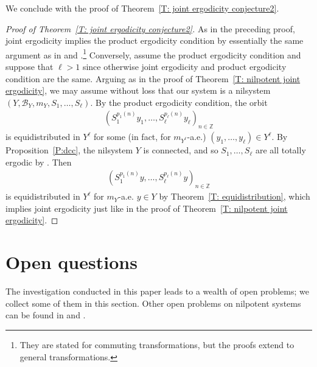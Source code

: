 \documentclass[11pt]{amsart}
\theoremstyle{definition}
\newcommand{\Z}{{\mathbb Z}}
\newcommand{\CB}{{\mathcal B}}
\newcommand{\1}{{\mathbf{1}}}
\begin{document}
We conclude with the proof of Theorem~\ref{T: joint ergodicity conjecture2}.



 

\begin{proof}[Proof of Theorem~\ref{T: joint ergodicity conjecture2}]

As in the preceding proof, joint ergodicity implies the product ergodicity condition by essentially the same argument as in \cite[Proposition~6.2]{DFKS22} and \cite[Lemma~12.6]{DKKST24}.\footnote{They are stated for commuting transformations, but the proofs extend to general transformations.} Conversely, assume the product ergodicity condition and suppose that $\ell>1$ since otherwise joint ergodicity and product ergodicity condition are the same. 
Arguing as in the proof of Theorem~\ref{T: nilpotent joint ergodicity}, we may assume without loss that our system is a nilsystem $(Y, \CB_Y, m_Y, S_1, \ldots, S_\ell)$. By the product ergodicity condition, the orbit
\begin{align}\nonumber
        (S_1^{p_1(n)}y_{1}, \ldots, S_\ell^{p_\ell(n)}y_{\ell})_{n\in\Z}
    \end{align}
    is equidistributed in $Y^{\ell}$ for some (in fact, for $m_{Y^\ell}$-a.e.) $(y_{1},\dots,y_{\ell})\in Y^\ell$. By Proposition~\ref{P:dcc}, the nilsystem $Y$ is connected, and so $S_1, \ldots, S_\ell$ are all totally ergodic by \cite[Chapter 11, Corollary 7]{HK18}. Then
    \begin{align}\nonumber
        (S_1^{p_1(n)}y, \ldots, S_\ell^{p_\ell(n)}y)_{n\in\Z}
    \end{align}
    is equidistributed in $Y^\ell$ for $m_Y$-a.e. $y\in Y$ by Theorem~\ref{T: equidistribution}, which implies joint ergodicity just like in the proof of Theorem~\ref{T: nilpotent joint ergodicity}. 
\end{proof}



     




\section{Open questions}\label{S: open problems}

The investigation conducted in this paper leads to a wealth of open problems; we collect some of them in this section. Other open problems on nilpotent systems can be found in \cite[Section 5]{BL02} and \cite[Section 7]{Kuc26}.
\end{document}

